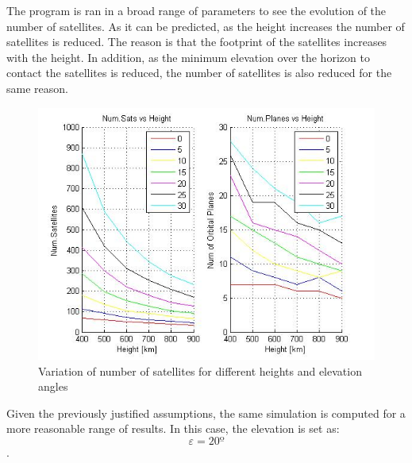 The program is ran in a broad range of parameters to see the evolution of the number of satellites. As it can be predicted, as the height increases the number of satellites is reduced. The reason is that the footprint of the satellites increases with the height. In addition, as the minimum elevation over the horizon to contact the satellites is reduced, the number of satellites is also reduced for the same reason.

\begin{figure}[H]
\begin{center}
\includegraphics[scale=0.7]{PolarOrbits/GeneralResults.jpg}
\caption{Variation of number of satellites for different heights and elevation angles}
\end{center}
\end{figure}

Given the previously justified assumptions, the same simulation is computed for a more reasonable range of results. In this case, the elevation is set as: $$\varepsilon = 20º$$.

